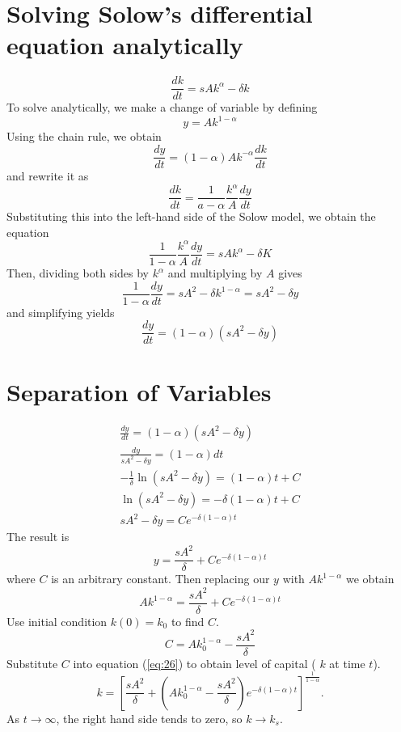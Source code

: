 \documentclass[11pt,a4paper]{article}
\begin{document}
	\section*{Solving Solow’s differential equation analytically}
	$$
	\frac{dk}{dt} = sAk^\alpha - \delta k
	$$
	To solve analytically, we make a change of variable by defining
	\begin{equation}\label{eq:26}
		y = Ak^{1-\alpha}
	\end{equation}
	Using the chain rule, we obtain
	$$
	\frac{dy}{dt} = (1-\alpha)Ak^{-\alpha}\frac{dk}{dt}
	$$
	and rewrite it as
	$$
	\frac{dk}{dt} = \frac{1}{a-\alpha}\frac{k^\alpha}{A}\frac{dy}{dt}
	$$
	Substituting this into the left-hand side of the Solow model, we obtain the equation
	$$
	\frac{1}{1-\alpha}\frac{k^\alpha}{A}\frac{dy}{dt} = sAk^\alpha - \delta K
	$$
	Then, dividing both sides by $k^\alpha$ and multiplying by $A$ gives
	$$
	\frac{1}{1-\alpha}\frac{dy}{dt} = sA^2-\delta k^{1-\alpha} = sA^2 - \delta y
	$$
	and simplifying yields
	\begin{equation}\label{eq:27}
		\frac{dy}{dt} = (1-\alpha)(sA^2-\delta y)
	\end{equation}
	\section*{Separation of Variables}
	\begin{gather*}
		\frac{dy}{dt} = (1-\alpha)(sA^2 - \delta y)\\
		\frac{dy}{sA^2-\delta y} = (1-\alpha)dt\\
		-\frac{1}{\delta}\ln (sA^2-\delta y) = (1-\alpha)t+C\\
		\ln (sA^2-\delta y) = -\delta(1-\alpha)t+C\\
		sA^2-\delta y=Ce^{-\delta(1-\alpha)t}
	\end{gather*}
	The result is
	$$
	y = \frac{sA^2}{\delta}+Ce^{-\delta(1-\alpha)t}
	$$
	where $C$ is an arbitrary constant. Then replacing our $y$ with $Ak^{1-\alpha}$ we obtain
	\begin{equation}\label{eq:28}
		Ak^{1-\alpha} = \frac{sA^2}{\delta} + Ce^{-\delta(1-\alpha)t}
	\end{equation}
	Use initial condition $k(0) = k_0$ to find $C$.
	\begin{equation}\label{29}
		C = Ak_0^{1-\alpha} - \frac{sA^2}{\delta}
	\end{equation}
	Substitute $C$ into equation (\ref{eq:26}) to obtain level of capital ( $k$ at time $t$).
	\begin{equation}\label{30}
		k = \left[\frac{sA^2}{\delta}+\left(Ak_0^{1-\alpha}-\frac{sA^2}{\delta}\right)e^{-\delta(1-\alpha)t}\right]^{\frac{1}{1-\alpha}}.
	\end{equation}
	As $t \to \infty$, the right hand side tends to zero, so $k \to k_s$.
\end{document}

